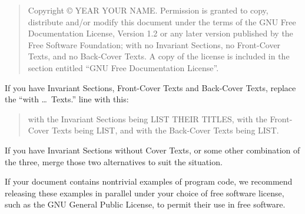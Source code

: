 \medskip
\begin{quote}
    Copyright \copyright{}  YEAR  YOUR NAME.
    Permission is granted to copy, distribute and/or modify this document
    under the terms of the GNU Free Documentation License, Version 1.2
    or any later version published by the Free Software Foundation;
    with no Invariant Sections, no Front-Cover Texts, and no Back-Cover Texts.
    A copy of the license is included in the section entitled ``GNU
    Free Documentation License''.
\end{quote}
\medskip
    
If you have Invariant Sections, Front-Cover Texts and Back-Cover Texts,
replace the ``with \dots\ Texts.'' line with this:

\medskip
\begin{quote}
    with the Invariant Sections being LIST THEIR TITLES, with the
    Front-Cover Texts being LIST, and with the Back-Cover Texts being LIST.
\end{quote}
\medskip
    
If you have Invariant Sections without Cover Texts, or some other
combination of the three, merge those two alternatives to suit the
situation.

If your document contains nontrivial examples of program code, we
recommend releasing these examples in parallel under your choice of
free software license, such as the GNU General Public License,
to permit their use in free software.

%
